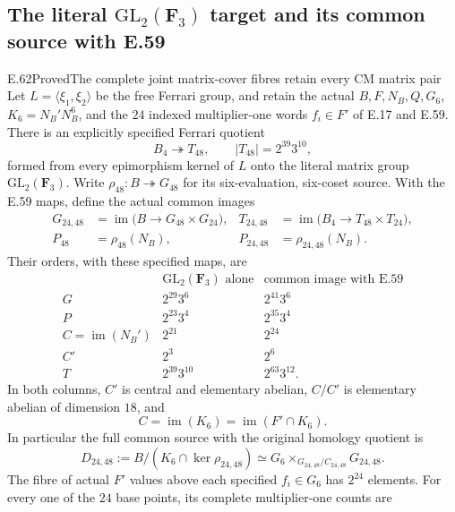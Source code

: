 \subsection{The literal \texorpdfstring{$\mathrm{GL}_2(\mathbf F_3)$}{GL2(F3)} target and its common source with E.59}

\begin{statement}{E.62}{Proved}{The complete joint matrix-cover fibres retain every CM matrix pair}
Let $L=\langle\xi_1,\xi_2\rangle$ be the free Ferrari group, and retain
the actual $B,F,N_B,Q,G_6$, $K_6=N_B'N_B^6$, and the $24$ indexed
multiplier-one words $f_i\in F'$ of E.17 and E.59.  There is an explicitly
specified Ferrari quotient
\[
 B_4\twoheadrightarrow T_{48},\qquad |T_{48}|=2^{39}3^{10},
 \tag{E.62.1}
\]
formed from every epimorphism kernel of $L$ onto the literal matrix group
$\mathrm{GL}_2(\mathbf F_3)$.  Write $\rho_{48}:B\twoheadrightarrow G_{48}$
for its six-evaluation, six-coset source.  With the E.59 maps, define
the actual common images
\[
 \begin{aligned}
 G_{24,48}&=\operatorname{im}\bigl(B\longrightarrow G_{48}\times G_{24}\bigr),
 &T_{24,48}&=\operatorname{im}\bigl(B_4\longrightarrow T_{48}\times T_{24}\bigr),\\
 P_{48}&=\rho_{48}(N_B),
 &P_{24,48}&=\rho_{24,48}(N_B).
 \end{aligned}
 \tag{E.62.2}
\]
Their orders, with these specified maps, are
\[
 \begin{array}{c|r|r}
 &\mathrm{GL}_2(\mathbf F_3)\text{ alone}&\text{common image with E.59}\\\hline
 G&2^{29}3^6&2^{41}3^6\\
 P&2^{23}3^4&2^{35}3^4\\
 C=\operatorname{im}(N_B')&2^{21}&2^{24}\\
 C'&2^3&2^6\\
 T&2^{39}3^{10}&2^{63}3^{12}.
 \end{array}
 \tag{E.62.3}
\]
In both columns, $C'$ is central and elementary abelian, $C/C'$ is
elementary abelian of dimension $18$, and
\[
 C=\operatorname{im}(K_6)=\operatorname{im}(F'\cap K_6).
 \tag{E.62.4}
\]
In particular the full common source with the original homology quotient is
\[
 D_{24,48}:=B/(K_6\cap\ker\rho_{24,48})
 \simeq G_6\mathbin{\times_{G_{24,48}/C_{24,48}}}G_{24,48}.
 \tag{E.62.5}
\]
The fibre of actual $F'$ values above each specified $f_i\in G_6$
has $2^{24}$ elements.  For every one of the $24$ base points, its
complete multiplier-one counts are
\[
 \begin{array}{l|r|r}

\end{array}\]
\end{statement}
